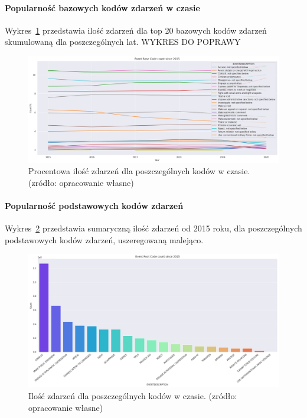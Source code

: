 \documentclass[11pt]{report}
\begin{document}
    \paragraph{Popularność bazowych kodów zdarzeń w czasie}
    Wykres~\ref{fig:GLOBALEBCperc} przedstawia ilość zdarzeń dla top 20 bazowych kodów zdarzeń skumulowaną dla poszczególnych lat.
    WYKRES DO POPRAWY
    \begin{figure}[ht]
        \centering
        \includegraphics[width=1 \textwidth]{fig/GLOBAL/EBCperc.png}
        \caption{Procentowa ilość zdarzeń dla poszczególnych kodów w czasie. (zródło: opracowanie własne)}
        \label{fig:GLOBALEBCperc}
    \end{figure}

    \paragraph{Popularność podstawowych kodów zdarzeń}
    Wykres~\ref{fig:GLOBALERC} przedstawia sumaryczną ilość zdarzeń od 2015 roku, dla poszczególnych podstawowych kodów zdarzeń, uszeregowaną malejąco.
    \begin{figure}[ht]
        \centering
        \includegraphics[width=1 \textwidth]{fig/GLOBAL/ERC.png}
        \caption{Ilość zdarzeń dla poszczególnych kodów w czasie. (zródło: opracowanie własne)}
        \label{fig:GLOBALERC}
    \end{figure}
\end{document}

